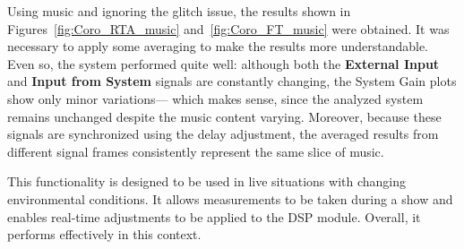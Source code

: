 Using music and ignoring the glitch issue, the results shown in Figures~\ref{fig:Coro_RTA_music} and~\ref{fig:Coro_FT_music} were obtained. It was necessary to apply some averaging to make the results more understandable. Even so, the system performed quite well: although both the \textbf{External Input} and \textbf{Input from System} signals are constantly changing, the System Gain plots show only minor variations— which makes sense, since the analyzed system remains unchanged despite the music content varying. Moreover, because these signals are synchronized using the delay adjustment, the averaged results from different signal frames consistently represent the same slice of music.

This functionality is designed to be used in live situations with changing environmental conditions. It allows measurements to be taken during a show and enables real-time adjustments to be applied to the DSP module. Overall, it performs effectively in this context.

